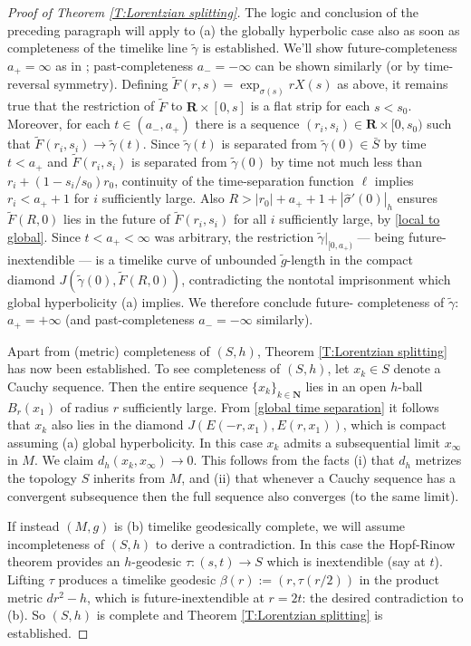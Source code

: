 \documentclass[12pt]{amsart}
\newcommand{\R}{{\mathbf R}}
\begin{document}
\begin{proof}[Proof of Theorem \ref{T:Lorentzian splitting}]
The logic and conclusion of the preceding paragraph will apply to {(a) the globally hyperbolic} case  also as soon as
completeness of the timelike line $\tilde \gamma$
is established.  We'll show future-completeness $a_+=\infty$ as in \cite{Galloway89};  past-completeness $a_-=-\infty$ can be shown similarly (or by time-reversal symmetry).
Defining $\tilde F(r,s) = \exp_{\sigma(s)} r X(s)$
as above, it remains true that the restriction of $\tilde F$ to $\R \times [0,s]$ is a flat strip for each $s<s_0$.  Moreover,  for each $t \in (a_-,a_+)$
there is a sequence $(r_i,s_i) \in \R \times [0,s_0)$
such that $\tilde F(r_i,s_i) \to \tilde \gamma(t)$.
Since $\tilde \gamma(t)$ is separated from $\tilde \gamma(0) \in \bar S$ by time $t<a_+$ and $\tilde F(r_i,s_i)$ is separated from $\tilde \gamma(0)$ by time not much less than $r_i + (1-s_i/s_0)r_0$,
continuity of the time-separation function $\ell$
implies $r_i < a_+ + 1$ for $i$ sufficiently large.
Also $R>|r_0| + a_++1 + |\hat \sigma'(0)|_h$
ensures 
$\tilde F(R,0)$ lies in the future of
$\tilde F(r_i,s_i)$ for all $i$ sufficiently large,
by \eqref{local to global}.
Since $t<a_+<\infty$ was arbitrary, the restriction 
$\tilde \gamma|_{[0,a_+)}$ --- being future-inextendible --- is a timelike curve of unbounded $\tilde g$-length in the compact diamond 
$J(\tilde \gamma(0),\tilde F(R,0))$,
contradicting the nontotal imprisonment which global hyperbolicity (a) implies.
We therefore conclude future-%
completeness of $\tilde \gamma$:  $a_+=+\infty$ 
(and past-completeness $a_-=-\infty$ similarly).




Apart from (metric) completeness of $(S,h)$,  Theorem \ref{T:Lorentzian splitting} has now been established.
To see completeness of $(S,h)$, let $x_k \in S$ denote a Cauchy sequence.  Then the entire sequence $\{x_k\}_{k \in {\mathbf N}}$ lies in an open $h$-ball $B_r(x_1)$
of radius $r$ sufficiently large. From \eqref{global time separation} it follows that $x_k$ also lies in the diamond $J(E(-r,x_1),E(r,x_1))$, which is compact assuming
(a) global hyperbolicity.  In this case $x_k$ admits a subsequential limit $x_\infty$ in $M$.  We claim $d_h(x_k,x_\infty) \to 0$. This follows from the facts
(i) that $d_h$ metrizes the topology $S$ inherits from $M$,
and (ii) that whenever a Cauchy sequence has a convergent subsequence then the full sequence also converges (to the same limit).

If instead $(M,g)$ is (b) timelike geodesically complete,  we will assume incompleteness of $(S,h)$ to derive a contradiction. In this case the Hopf-Rinow theorem provides an $h$-geodesic $\tau:(s,t) \longrightarrow S$ which is inextendible (say at $t$).
Lifting $\tau$ produces a timelike geodesic $\beta(r):=(r,\tau(r/2))$ in the product metric $dr^2 -h$, which is future-inextendible at $r=2t$:
the desired contradiction to (b).  So $(S,h)$ is complete and Theorem \ref{T:Lorentzian splitting} is established.
\end{proof}
\end{document}
